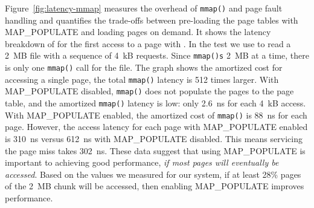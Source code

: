 Figure~\ref{fig:latency-mmap} measures the overhead of \texttt{mmap()} and page fault handling and quantifies the trade-offs between pre-loading the page tables with MAP\_POPULATE and loading pages on demand.
It shows the latency breakdown of for the first access to a page with \DAChell{}.
In the test we use \DAChell{} to read a 2~MB file
with a sequence of 4~kB requests.
Since \DAChell{} \texttt{mmap()s} 2~MB at a time,
there is only one \texttt{mmap()} call
for the file.  The graph shows the amortized cost for accessing a single page, the total \texttt{mmap()} latency is 512 times larger.
With MAP\_POPULATE disabled, \texttt{mmap()} does not populate the pages
to the page table, and the  amortized \texttt{mmap()} latency is low: only 2.6~ns
for each 4~kB access.  With MAP\_POPULATE enabled,
the amortized cost of \texttt{mmap()} is 88~ns for each page.
However, the access latency
for each page with MAP\_POPULATE enabled is 310~ns versus 612~ns
with MAP\_POPULATE disabled.  This means servicing the page miss takes 302~ns.  These data suggest that using MAP\_POPULATE is important to achieving good performance, \emph{if most pages will eventually be accessed}.
Based on the values we measured for our system, if at least 28\% pages of the 2~MB chunk will be accessed, then enabling MAP\_POPULATE improves performance.



